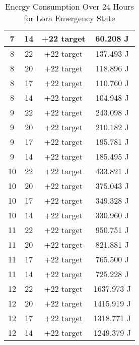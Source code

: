 \begin{table*}[ht]
\begin{tabularx}{\columnwidth}{c c c c}
    7 & 14 & +22 target & 60.208 J \\
    \midrule
    8 & 22 & +22 target & 137.493 J \\
    
    8 & 20 & +22 target & 118.896 J \\
    
    8 & 17 & +22 target & 110.760 J \\
    
    8 & 14 & +22 target & 104.948 J \\
    \midrule
    9 & 22 & +22 target & 243.098 J \\
    
    9 & 20 & +22 target & 210.182 J \\
    
    9 & 17 & +22 target & 195.781 J \\
    
    9 & 14 & +22 target & 185.495 J \\
    \midrule
    10 & 22 & +22 target & 433.821 J \\
    
    10 & 20 & +22 target & 375.043 J \\
    
    10 & 17 & +22 target & 349.328 J \\
    
    10 & 14 & +22 target & 330.960 J \\
    \midrule
    11 & 22 & +22 target & 950.751 J \\
    
    11 & 20 & +22 target & 821.881 J \\
    
    11 & 17 & +22 target & 765.500 J \\
    
    11 & 14 & +22 target & 725.228 J \\
    \midrule
    12 & 22 & +22 target & 1637.973 J \\
    
    12 & 20 & +22 target & 1415.919 J \\
    
    12 & 17 & +22 target & 1318.771 J \\
    
    12 & 14 & +22 target & 1249.379 J \\
    \bottomrule
    \end{tabularx}
    \caption{Energy Consumption Over 24 Hours for Lora Emergency State}
    \label{tab:energy_consumption_24h_revised}
\end{table*}

